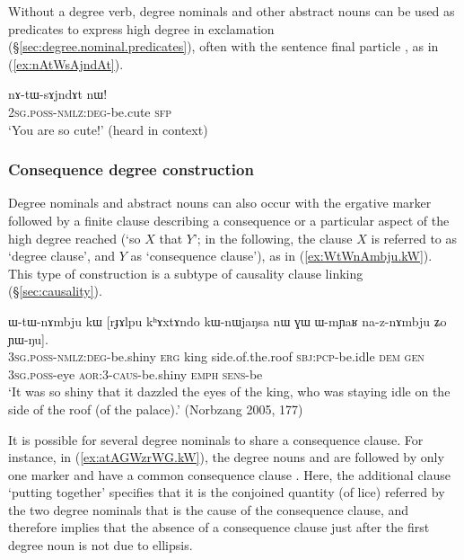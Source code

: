 Without a degree verb, degree nominals and other abstract nouns can be used as predicates to express high degree in exclamation (§\ref{sec:degree.nominal.predicates}), often with the sentence final particle , as in (\ref{ex:nAtWsAjndAt}).

\begin{exe}
\ex \label{ex:nAtWsAjndAt}
\gll nɤ-tɯ-sɤjndɤt nɯ! \\
\textsc{2sg}.\textsc{poss}-\textsc{nmlz}:\textsc{deg}-be.cute \textsc{sfp} \\
\glt `You are so cute!' (heard in context)
\end{exe}



\subsubsection{Consequence degree construction} \label{sec:degree.consequence}
Degree nominals and abstract nouns can also occur with the ergative marker  followed by a finite clause describing a consequence or a particular aspect of the high degree reached (`so $X$ that $Y$'; in the following, the clause $X$ is referred to as `degree clause', and $Y$ as `consequence clause'), as in (\ref{ex:WtWnAmbju.kW}). This type of construction is a subtype of causality clause linking (§\ref{sec:causality}).

\begin{exe}
\ex \label{ex:WtWnAmbju.kW}
\gll ɯ-tɯ-nɤmbju kɯ [rɟɤlpu kʰɤxtɤndo kɯ-nɯjaŋsa nɯ ɣɯ ɯ-mɲaʁ na-z-nɤmbju ʑo ɲɯ-ŋu]. \\
\textsc{3sg}.\textsc{poss}-\textsc{nmlz}:\textsc{deg}-be.shiny \textsc{erg} king side.of.the.roof \textsc{sbj}:\textsc{pcp}-be.idle \textsc{dem} \textsc{gen} \textsc{3sg}.\textsc{poss}-eye \textsc{aor}:3\flobv{}-\textsc{caus}-be.shiny \textsc{emph} \textsc{sens}-be\\
\glt `It was so shiny that it dazzled the eyes of the king, who was staying idle on the side of the roof (of the palace).' (Norbzang 2005, 177)
\end{exe}

It is possible for several degree nominals to share a consequence clause. For instance, in (\ref{ex:atAGWzrWG.kW}), the degree nouns  and  are followed by only one marker  and have a common consequence clause . Here, the additional clause  `putting together' specifies that it is the conjoined quantity (of lice) referred by the two degree nominals that is the cause of the consequence clause, and therefore implies that the absence of a consequence clause just after the first degree noun  is not due to ellipsis.

